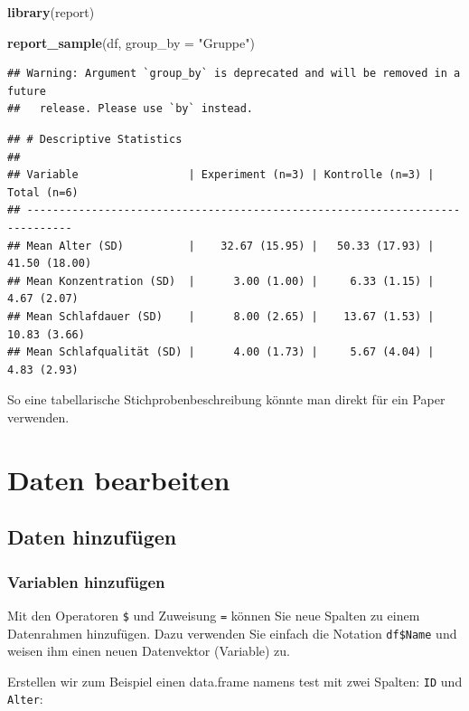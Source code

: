 \documentclass[
]{book}
\newenvironment{Shaded}{\begin{snugshade}}{\end{snugshade}}
\newcommand{\AttributeTok}[1]{\textcolor[rgb]{0.13,0.29,0.53}{#1}}
\newcommand{\FunctionTok}[1]{\textcolor[rgb]{0.13,0.29,0.53}{\textbf{#1}}}
\newcommand{\NormalTok}[1]{#1}
\newcommand{\StringTok}[1]{\textcolor[rgb]{0.31,0.60,0.02}{#1}}
\begin{document}
\begin{Shaded}
\begin{Highlighting}[]
\FunctionTok{library}\NormalTok{(report)}

\FunctionTok{report\_sample}\NormalTok{(df, }\AttributeTok{group\_by =} \StringTok{"Gruppe"}\NormalTok{)}
\end{Highlighting}
\end{Shaded}

\begin{verbatim}
## Warning: Argument `group_by` is deprecated and will be removed in a future
##   release. Please use `by` instead.
\end{verbatim}

\begin{verbatim}
## # Descriptive Statistics
## 
## Variable                 | Experiment (n=3) | Kontrolle (n=3) |   Total (n=6)
## -----------------------------------------------------------------------------
## Mean Alter (SD)          |    32.67 (15.95) |   50.33 (17.93) | 41.50 (18.00)
## Mean Konzentration (SD)  |      3.00 (1.00) |     6.33 (1.15) |   4.67 (2.07)
## Mean Schlafdauer (SD)    |      8.00 (2.65) |    13.67 (1.53) |  10.83 (3.66)
## Mean Schlafqualität (SD) |      4.00 (1.73) |     5.67 (4.04) |   4.83 (2.93)
\end{verbatim}

So eine tabellarische Stichprobenbeschreibung könnte man direkt für ein Paper verwenden.

\chapter{Daten bearbeiten}\label{daten-bearbeiten}

\section{Daten hinzufügen}\label{daten-hinzufuxfcgen}

\subsection{Variablen hinzufügen}\label{variablen-hinzufuxfcgen}

Mit den Operatoren \texttt{\$} und Zuweisung \texttt{=} können Sie neue Spalten zu einem Datenrahmen hinzufügen. Dazu verwenden Sie einfach die Notation \texttt{df\$Name} und weisen ihm einen neuen Datenvektor (Variable) zu.

Erstellen wir zum Beispiel einen data.frame namens test mit zwei Spalten: \texttt{ID} und \texttt{Alter}:
\end{document}
